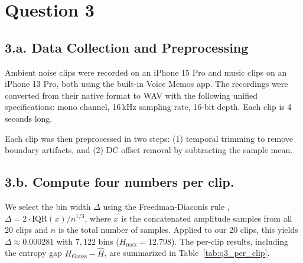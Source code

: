 \documentclass[a4paper,10pt]{article}
\theoremstyle{nonumberplain}
\theoremstyle{nonumberplain}
\theoremstyle{nonumberplain}
\theoremstyle{nonumberplain}
\begin{document}
\section{Question 3} 
\subsection*{3.a. Data Collection and Preprocessing}
Ambient noise clips were recorded on an iPhone 15 Pro and music clips on an iPhone 13 Pro, both using the built-in Voice Memos app. The recordings were converted from their native format to WAV with the following unified specifications: mono channel, 16\,kHz sampling rate, 16-bit depth. Each clip is 4 seconds long.

Each clip was then preprocessed in two steps: (1) temporal trimming to remove boundary artifacts, and (2) DC offset removal by subtracting the sample mean.
\subsection*{3.b. Compute four numbers per clip.}
We select the bin width $\Delta$ using the Freedman-Diaconis rule \cite{an2025}, $\Delta = 2 \cdot \text{IQR}(x) / n^{1/3}$, where $x$ is the concatenated amplitude samples from all 20 clips and $n$ is the total number of samples. Applied to our 20 clips, this yields $\Delta \approx 0.000281$ with $7{,}122$ bins ($H_{\max} = 12.798$). The per-clip results, including the entropy gap $H_{\text{Gauss}} - \widehat{H}$, are summarized in Table~\ref{tab:q3_per_clip}.


\end{document}
